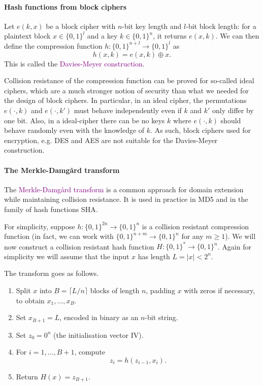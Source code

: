 \documentclass[a4paper, 11pt, openany]{book}
\numberwithin{equation}{section}
\theoremstyle{plain}
\theoremstyle{definition}
\newcommand{\Define}[1]{\textcolor{purple}{#1}}
\begin{document}
\paragraph{Hash functions from block ciphers}

Let $e(k,x)$ be a block cipher with $n$-bit key length and $l$-bit block length: for a plaintext block $x \in \{0,1\}^l$ and a key $k \in \{0,1\}^n$, it returns $e(x,k)$. We can then define the compression function $h : \{0,1\}^{n + l} \to \{0,1\}^l$ as
\[
    h(x,k) = e(x,k) \oplus x.
\]
This is called the \Define{Davies-Meyer construction}.

Collision resistance of the compression function can be proved for so-called ideal ciphers, which are a much stronger notion of security than what we needed for the design of block ciphers. In particular, in an ideal cipher, the permutations $e(\cdot,k)$ and $e(\cdot,k')$ must behave independently even if $k$ and $k'$ only differ by one bit. Also, in a ideal-cipher there can be no keys $k$ where $e(\cdot,k)$ should behave randomly even with the knowledge of $k$. As such, block ciphers used for encryption, e.g. DES and AES are not suitable for the Davies-Meyer construction.

\paragraph{The Merkle-Damg\aa{}rd transform}

The \Define{Merkle-Damg\aa{}rd transform} is a common approach for domain extension while maintaining collision resistance. It is used in practice in MD5 and in the family of hash functions SHA.

For simplicity, suppose $h : \{0,1\}^{2n} \to \{0,1\}^n$ is a collision resistant compression function (in fact, we can work with $\{0,1\}^{n+m} \to \{0,1\}^n$ for any $m \ge 1$). We will now construct a collision resistant hash function $H : \{0,1\}^* \to \{0,1\}^n$. Again for simplicity we will assume that the input $x$ has length $L = |x| < 2^n$.

The transform goes as follows.
\begin{enumerate}
    \item Split $x$ into $B = \lceil L/n \rceil$ blocks of length $n$, padding $x$ with zeros if necessary, to obtain $x_1, \dots, x_B$.
    
    \item Set $x_{B+1} = L$, encoded in binary as an $n$-bit string.
    
    \item Set $z_0 = 0^n$ (the initialisation vector IV).
    
    \item For $i=1, \dots, B+1$, compute
    \[
        z_i = h( z_{i-1}, x_i).
    \]
    
    \item Return $H(x) = z_{B+1}$.
\end{enumerate}
\end{document}
